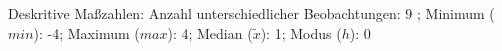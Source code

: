 				\label{tableValues:cski02g}
				\vspace*{-\baselineskip}
                    \begin{noten}
                	    \note{} Deskritive Maßzahlen:
                	    Anzahl unterschiedlicher Beobachtungen: 9%
                	    ; 
                	      Minimum ($min$): -4; 
                	      Maximum ($max$): 4; 
                	      Median ($\tilde{x}$): 1; 
                	      Modus ($h$): 0
                     \end{noten}


